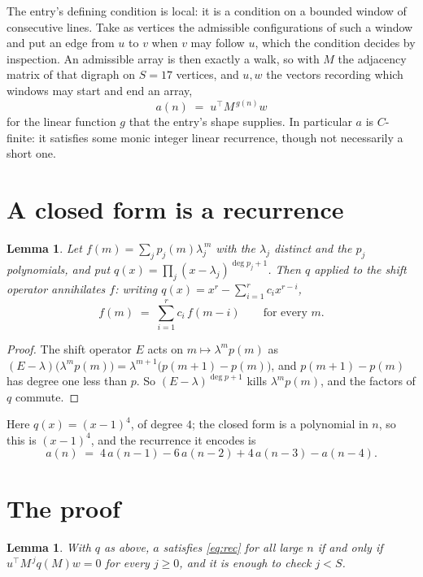 \documentclass[11pt,a4paper]{article}
\theoremstyle{plain}
\newtheorem{lemma}[theorem]{Lemma}
\theoremstyle{definition}
\begin{document}
The entry's defining condition is local: it is a condition on a bounded window of consecutive lines. Take as vertices the
admissible configurations of such a window and put an edge from $u$ to $v$ when $v$ may
follow $u$, which the condition decides by inspection. An admissible array is then exactly a
walk, so with $M$ the adjacency matrix of that digraph on $S=17$ vertices, and $u,w$ the
vectors recording which windows may start and end an array,
\[
a(n)\;=\;u^{\!\top}M^{\,g(n)}w
\]
for the linear function $g$ that the entry's shape supplies. In particular $a$ is
$C$-finite: it satisfies some monic integer linear recurrence, though not necessarily a short
one.

\section{A closed form is a recurrence}

\begin{lemma}\label{lem:ann}
Let $f(m)=\sum_{j}p_j(m)\lambda_j^{\,m}$ with the $\lambda_j$ distinct and the $p_j$
polynomials, and put $q(x)=\prod_j(x-\lambda_j)^{\deg p_j+1}$. Then $q$ applied to the shift
operator annihilates $f$: writing $q(x)=x^{r}-\sum_{i=1}^{r}c_ix^{r-i}$,
\[
f(m)\;=\;\sum_{i=1}^{r}c_i\,f(m-i)\qquad\text{for every }m.
\]
\end{lemma}

\begin{proof}
The shift operator $E$ acts on $m\mapsto\lambda^{m}p(m)$ as
$(E-\lambda)\bigl(\lambda^{m}p(m)\bigr)=\lambda^{m+1}\bigl(p(m+1)-p(m)\bigr)$, and
$p(m+1)-p(m)$ has degree one less than $p$. So $(E-\lambda)^{\deg p+1}$ kills
$\lambda^{m}p(m)$, and the factors of $q$ commute.
\end{proof}

Here $q(x)=(x-1)^{4}$, of degree $4$; the closed form is a polynomial in $n$, so this is $(x-1)^{4}$, and the recurrence it encodes is
\begin{equation}\label{eq:rec}
a(n)\;=\;4\,a(n-1) - 6\,a(n-2) + 4\,a(n-3) - a(n-4).
\end{equation}

\section{The proof}

\begin{lemma}\label{lem:crit}
With $q$ as above, $a$ satisfies \eqref{eq:rec} for all large $n$ if and only if
$u^{\!\top}M^{\,j}q(M)w=0$ for every $j\ge0$, and it is enough to check $j<S$.
\end{lemma}
\end{document}
